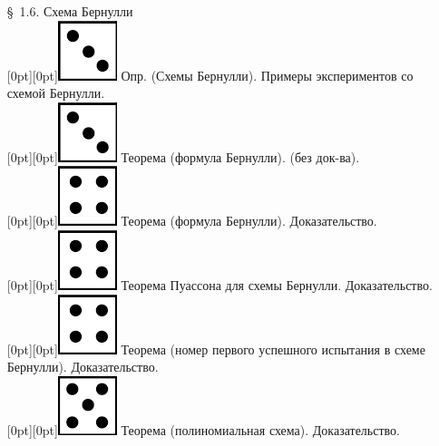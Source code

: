 \documentclass[10pt]{amsart}
\begin{document}
\begin{enumerate}
\begin{enumerate}
    \item[\S\, 1.6.] Схема Бернулли \\
 \raisebox{-1pt}[0pt][0pt]{\includegraphics[width=0.02\linewidth]{3.png}} Опр. (Схемы Бернулли). Примеры экспериментов со схемой Бернулли. \\
 \raisebox{-1pt}[0pt][0pt]{\includegraphics[width=0.02\linewidth]{3.png}} Теорема (формула Бернулли). (без док-ва). \\
 \raisebox{-1pt}[0pt][0pt]{\includegraphics[width=0.02\linewidth]{4.png}} Теорема (формула Бернулли). Доказательство. \\
 \raisebox{-1pt}[0pt][0pt]{\includegraphics[width=0.02\linewidth]{4.png}} Теорема Пуассона для схемы Бернулли. Доказательство. \\
 \raisebox{-1pt}[0pt][0pt]{\includegraphics[width=0.02\linewidth]{4.png}} Теорема (номер первого успешного испытания в схеме Бернулли). Доказательство. \\
 \raisebox{-1pt}[0pt][0pt]{\includegraphics[width=0.02\linewidth]{5.png}} Теорема (полиномиальная схема). Доказательство. \\

    
    

\end{enumerate}
\end{enumerate}
\end{document}

